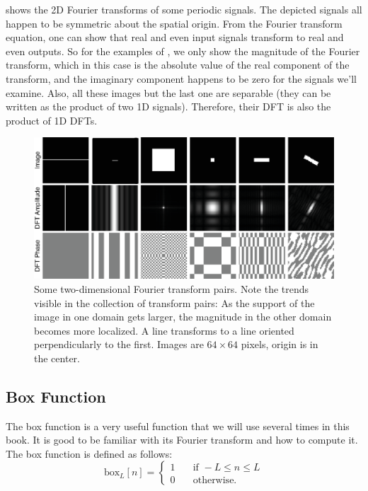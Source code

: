 \Fig{\ref{fig:2ddftexamples}} shows the 2D Fourier transforms of
some periodic signals.  The depicted signals all happen to be symmetric
about the spatial origin.  From the Fourier transform equation, one
can show that real and even input signals transform to real and even
outputs.  So for the examples of \fig{\ref{fig:2ddftexamples}}, we only
show the magnitude of the Fourier transform, which in this case is the
absolute value of the real component of the transform, and the
imaginary component happens to be zero for the signals we'll examine. Also, all these images but the last one are separable (they can be written as the product of two 1D signals). Therefore, their DFT is also the product of 1D DFTs.


\begin{figure}
	\centerline{
		\includegraphics[width=1\linewidth]{figures/Image_processing_fourier/DFT_toy_examples.eps}
	}
	\caption{Some two-dimensional Fourier transform pairs.
		Note the trends visible in the collection of transform pairs:  As
		the support of the image in one domain gets larger, the magnitude in
		the other domain becomes more localized.  A line transforms to a
		line oriented perpendicularly to the first. Images are $64 \times 64$ pixels, origin is in the center.
	}
	\label{fig:2ddftexamples}
\end{figure}

\subsection{Box Function}
\label{sec:box_function}
The box function is a very useful function that we will use several times in this book. It is good to be familiar with its Fourier transform and how to compute it. The box function is defined as follows:
\begin{equation}
	\text{box}_{L} \left[n \right] =
	\begin{cases}
		1 & \quad \text{if } -L \leq n \leq L \\
		0 & \quad \text{otherwise.}
	\end{cases}
\end{equation}

